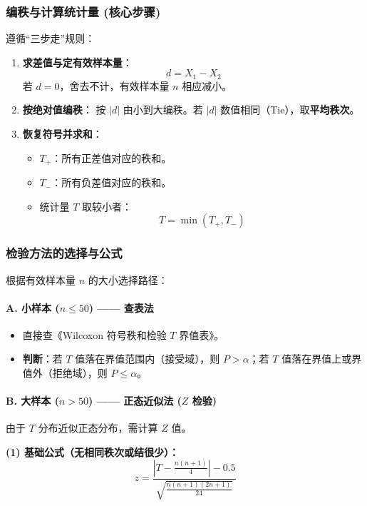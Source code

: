 \documentclass[lang=cn,10pt]{elegantbook}
\begin{document}
\subsubsection{编秩与计算统计量 (核心步骤)}
遵循“三步走”规则：

\begin{enumerate}
    \item \textbf{求差值与定有效样本量}：
    \[
    d = X_1 - X_2
    \]
    若 $d=0$，舍去不计，有效样本量 $n$ 相应减小。
    
    \item \textbf{按绝对值编秩}：
    按 $|d|$ 由小到大编秩。若 $|d|$ 数值相同（Tie），取\textbf{平均秩次}。
    
    \item \textbf{恢复符号并求和}：
    \begin{itemize}
        \item $T_+$：所有正差值对应的秩和。
        \item $T_-$：所有负差值对应的秩和。
        \item 统计量 $T$ 取较小者：
        \[
        T = \min(T_+, T_-)
        \]
    \end{itemize}
\end{enumerate}

\subsubsection{检验方法的选择与公式}

根据有效样本量 $n$ 的大小选择路径：

\paragraph{A. 小样本 ($n \le 50$) —— 查表法}
\begin{itemize}
    \item 直接查《Wilcoxon 符号秩和检验 $T$ 界值表》。
    \item \textbf{判断}：若 $T$ 值落在界值范围内（接受域），则 $P > \alpha$；若 $T$ 值落在界值上或界值外（拒绝域），则 $P \le \alpha$。
\end{itemize}

\paragraph{B. 大样本 ($n > 50$) —— 正态近似法 ($Z$ 检验)}
由于 $T$ 分布近似正态分布，需计算 $Z$ 值。

\textbf{(1) 基础公式（无相同秩次或结很少）：}
\[
z = \frac{\left|T-\frac{n(n+1)}{4}\right|-0.5}{\sqrt{\frac{n(n+1)(2n+1)}{24}}}
\]
\end{document}
